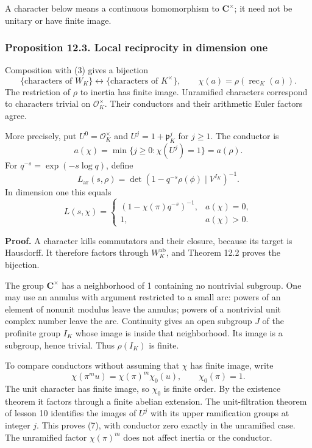 \documentclass[11pt,a4paper]{article}
\begin{document}
A character below means a continuous homomorphism to
\(\mathbf C^\times\); it need not be unitary or have finite image.

\subsubsection{Proposition 12.3. Local reciprocity in dimension
one}\label{proposition-12.3.-local-reciprocity-in-dimension-one}

Composition with (3) gives a bijection \[
\{\text{characters of }W_K\}
\longleftrightarrow
\{\text{characters of }K^\times\},\qquad
\chi(a)=\rho(\operatorname{rec}_K(a)).
\tag{6}
\] The restriction of \(\rho\) to inertia has finite image. Unramified
characters correspond to characters trivial on \(\mathcal O_K^\times\).
Their conductors and their arithmetic Euler factors agree.

More precisely, put \(U^0=\mathcal O_K^\times\) and
\(U^j=1+\mathfrak p_K^j\) for \(j\geq1\). The conductor is \[
a(\chi)=\min\{j\geq0:\chi(U^j)=1\}
       =a(\rho).
\tag{7}
\] For \(q^{-s}=\exp(-s\log q)\), define \[
L_{\mathrm{ar}}(s,\rho)
=\det(1-q^{-s}\rho(\phi)\mid V^{I_K})^{-1}.
\] In dimension one this equals \[
L(s,\chi)=
\begin{cases}
(1-\chi(\pi)q^{-s})^{-1},&a(\chi)=0,\\
1,&a(\chi)>0.
\end{cases}
\tag{8}
\]

\textbf{Proof.} A character kills commutators and their closure, because
its target is Hausdorff. It therefore factors through
\(W_K^{\mathrm{ab}}\), and Theorem 12.2 proves the bijection.

The group \(\mathbf C^\times\) has a neighborhood of 1 containing no
nontrivial subgroup. One may use an annulus with argument restricted to
a small arc: powers of an element of nonunit modulus leave the annulus;
powers of a nontrivial unit complex number leave the arc. Continuity
gives an open subgroup \(J\) of the profinite group \(I_K\) whose image
is inside that neighborhood. Its image is a subgroup, hence trivial.
Thus \(\rho(I_K)\) is finite.

To compare conductors without assuming that \(\chi\) has finite image,
write \[
\chi(\pi^m u)=\chi(\pi)^m\chi_0(u),\qquad \chi_0(\pi)=1.
\] The unit character has finite image, so \(\chi_0\) is finite order.
By the existence theorem it factors through a finite abelian extension.
The unit-filtration theorem of lesson 10 identifies the images of
\(U^j\) with its upper ramification groups at integer \(j\). This proves
(7), with conductor zero exactly in the unramified case. The unramified
factor \(\chi(\pi)^m\) does not affect inertia or the conductor.
\end{document}
